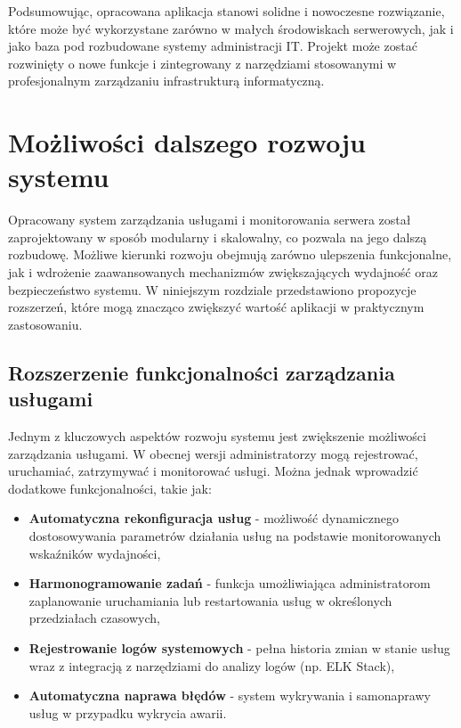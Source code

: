 Podsumowując, opracowana aplikacja stanowi solidne i nowoczesne rozwiązanie, które może być wykorzystane zarówno w małych środowiskach serwerowych, jak i jako baza pod rozbudowane systemy administracji IT. Projekt może zostać rozwinięty o nowe funkcje i zintegrowany z narzędziami stosowanymi w profesjonalnym zarządzaniu infrastrukturą informatyczną.


\section{Możliwości dalszego rozwoju systemu}

Opracowany system zarządzania usługami i monitorowania serwera został zaprojektowany w sposób modularny i skalowalny, co pozwala na jego dalszą rozbudowę. Możliwe kierunki rozwoju obejmują zarówno ulepszenia funkcjonalne, jak i wdrożenie zaawansowanych mechanizmów zwiększających wydajność oraz bezpieczeństwo systemu. W niniejszym rozdziale przedstawiono propozycje rozszerzeń, które mogą znacząco zwiększyć wartość aplikacji w praktycznym zastosowaniu.

\subsection{Rozszerzenie funkcjonalności zarządzania usługami}
Jednym z kluczowych aspektów rozwoju systemu jest zwiększenie możliwości zarządzania usługami. W obecnej wersji administratorzy mogą rejestrować, uruchamiać, zatrzymywać i monitorować usługi. Można jednak wprowadzić dodatkowe funkcjonalności, takie jak:
\begin{itemize}
    \item \textbf{Automatyczna rekonfiguracja usług} - możliwość dynamicznego dostosowywania parametrów działania usług na podstawie monitorowanych wskaźników wydajności,
    \item \textbf{Harmonogramowanie zadań} - funkcja umożliwiająca administratorom zaplanowanie uruchamiania lub restartowania usług w określonych przedziałach czasowych,
    \item \textbf{Rejestrowanie logów systemowych} - pełna historia zmian w stanie usług wraz z integracją z narzędziami do analizy logów (np. ELK Stack),
    \item \textbf{Automatyczna naprawa błędów} - system wykrywania i samonaprawy usług w przypadku wykrycia awarii.
\end{itemize}


